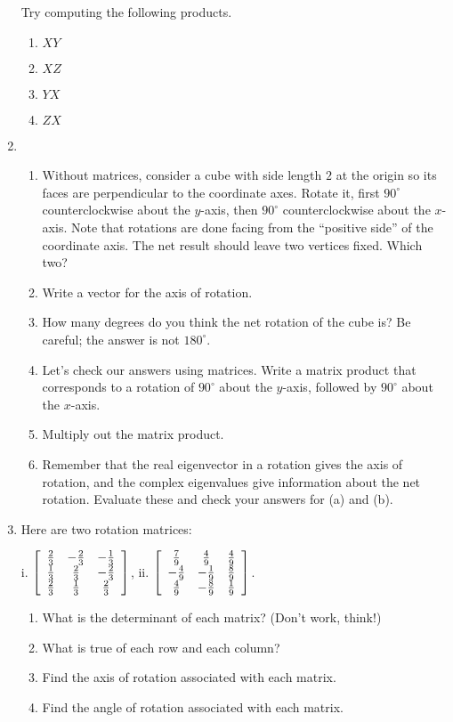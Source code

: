 \documentclass[../gatm.tex]{subfiles}
\begin{document}
\begin{enumerate}
Try computing the following products.
\begin{multicols}{4}
\begin{enumerate}
\item $XY$
\item $XZ$
\item $YX$
\item $ZX$
\end{enumerate}
\end{multicols}
\item \begin{enumerate}
\item Without matrices, consider a cube with side length $2$ at the origin so its faces are perpendicular to the coordinate axes. Rotate it, first $90^\circ$ counterclockwise about the $y$-axis, then $90^\circ$ counterclockwise about the $x$-axis. Note that rotations are done facing from the ``positive side'' of the coordinate axis. The net result should leave two vertices fixed. Which two?
\item Write a vector for the axis of rotation.
\item How many degrees do you think the net rotation of the cube is? Be careful; the answer is not $180^\circ$.
\item Let's check our answers using matrices. Write a matrix product that corresponds to a rotation of $90^\circ$ about the $y$-axis, followed by $90^\circ$ about the $x$-axis.
\item Multiply out the matrix product.
\item Remember that the real eigenvector in a rotation gives the axis of rotation, and the complex eigenvalues give information about the net rotation. Evaluate these and check your answers for (a) and (b).
\end{enumerate}
\item Here are two rotation matrices:

i. $\left[\begin{array}{ccc} \frac{2}{3} & -\frac{2}{3} & -\frac{1}{3} \\ \frac{1}{3} & \frac{2}{3} & -\frac{2}{3} \\ \frac{2}{3} & \frac{1}{3} & \frac{2}{3} \end{array}\right]$, ii. $\left[\begin{array}{ccc} \frac{7}{9} & \frac{4}{9} & \frac{4}{9} \\ -\frac{4}{9} & -\frac{1}{9} & \frac{8}{9} \\ \frac{4}{9} & -\frac{8}{9} & \frac{1}{9} \end{array}\right]$.
\begin{enumerate}
\item What is the determinant of each matrix? (Don't work, think!)
\item What is true of each row and each column?
\item Find the axis of rotation associated with each matrix.
\item Find the angle of rotation associated with each matrix.
\end{enumerate}
\end{enumerate}
\end{document}
